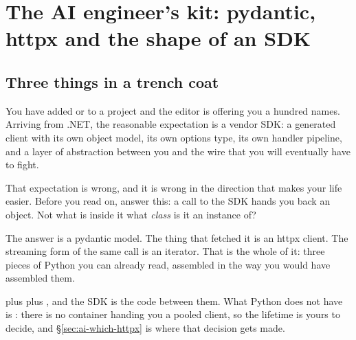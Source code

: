 
\chapter{The AI engineer's kit: pydantic, httpx and the shape of an SDK}
\label{ch:aitoolkit}

\section{Three things in a trench coat}
\label{sec:ai-three-things}

You have added  or  to a project and the editor is
offering you a hundred names. Arriving from .NET, the reasonable expectation
is a vendor SDK: a generated client with its own object model, its own
options type, its own handler pipeline, and a layer of abstraction between
you and the wire that you will eventually have to fight.

That expectation is wrong, and it is wrong in the direction that makes your
life easier. Before you read on, answer this: a call to the SDK hands you
back an object. Not what is inside it \dash{} what \emph{class} is it an
instance of?

The answer is a pydantic model. The thing that fetched it is an httpx
client. The streaming form of the same call is an iterator. That is the
whole of it: three pieces of Python you can already read, assembled in the
way you would have assembled them.


\begin{csbox}
 plus  plus
, and the SDK is the code between them. What
Python does not have is : there is no container
handing you a pooled client, so the lifetime is yours to decide, and
\S\ref{sec:ai-which-httpx} is where that decision gets made.
\end{csbox}

